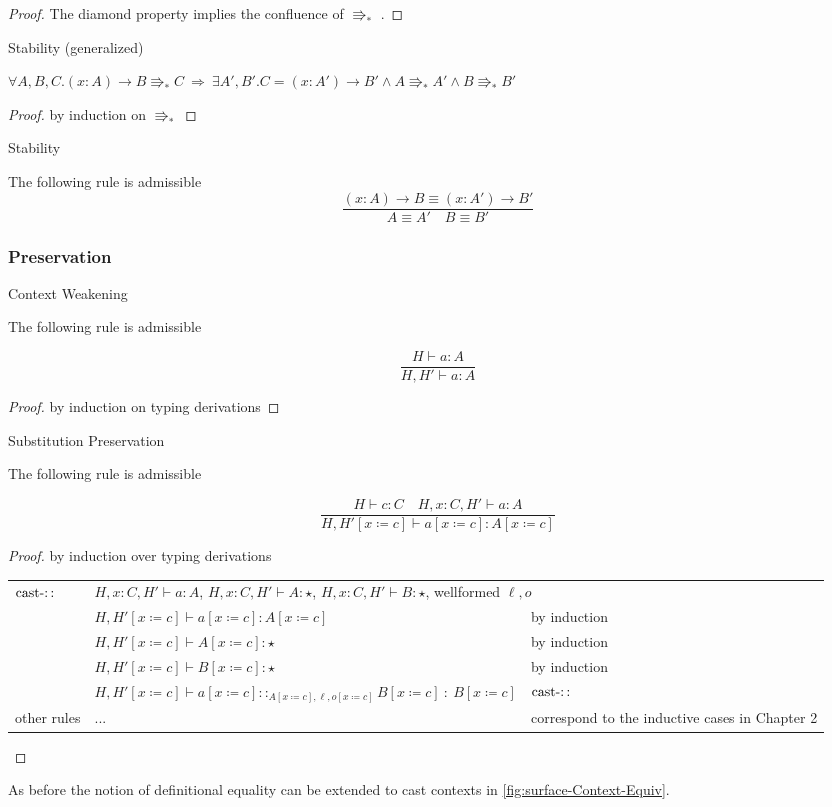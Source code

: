\begin{proof}
The diamond property implies the confluence of $\Rrightarrow_{\ast}$
.
\end{proof}
\begin{lem}
Stability (generalized)

$\forall A,B,C.\left(x:A\right)\rightarrow B\Rrightarrow_{\ast}C\:\Rightarrow\:\exists A',B'.C=\left(x:A'\right)\rightarrow B'\land A\Rrightarrow_{\ast}A'\land B\Rrightarrow_{\ast}B'$
\end{lem}

\begin{proof}
by induction on $\Rrightarrow_{\ast}$
\end{proof}
\begin{cor}
Stability

The following rule is admissible
\[
\frac{\left(x:A\right)\rightarrow B\equiv\left(x:A'\right)\rightarrow B'}{A\equiv A'\quad B\equiv B'}
\]
\end{cor}


\subsubsection{Preservation}
\begin{lem}
Context Weakening

The following rule is admissible

\[
\frac{H\vdash a:A}{H,H'\vdash a:A}
\]
\end{lem}

\begin{proof}
by induction on typing derivations
\end{proof}
\begin{lem}
Substitution Preservation

The following rule is admissible

\[
\frac{H\vdash c:C\quad H,x:C,H'\vdash a:A}{H,H'\left[x\coloneqq c\right]\vdash a\left[x\coloneqq c\right]:A\left[x\coloneqq c\right]}
\]
\end{lem}

\begin{proof}
by induction over typing derivations

\begin{tabular}{lll}
$\operatorname{cast-::}$ & \multicolumn{2}{l}{$H,x:C,H'\vdash a:A$, $H,x:C,H'\vdash A:\star$, $H,x:C,H'\vdash B:\star$,
wellformed $\ensuremath{\ell},o$}\tabularnewline
 & $H,H'\left[x\coloneqq c\right]\vdash a\left[x\coloneqq c\right]:A\left[x\coloneqq c\right]$ & by induction\tabularnewline
 & $H,H'\left[x\coloneqq c\right]\vdash A\left[x\coloneqq c\right]:\star$ & by induction\tabularnewline
 & $H,H'\left[x\coloneqq c\right]\vdash B\left[x\coloneqq c\right]:\star$ & by induction\tabularnewline
 & $H,H'\left[x\coloneqq c\right]\vdash a\left[x\coloneqq c\right]::_{A\left[x\coloneqq c\right],\ensuremath{\ell},o\left[x\coloneqq c\right]}B\left[x\coloneqq c\right]\::\:B\left[x\coloneqq c\right]$ & $\operatorname{cast-::}$\tabularnewline
other rules & ... & correspond to the inductive cases in Chapter 2\tabularnewline
\end{tabular}
\end{proof}
As before the notion of definitional equality can be extended to cast
contexts in \ref{fig:surface-Context-Equiv}.

